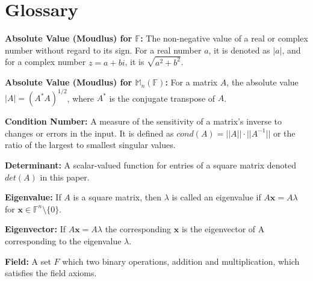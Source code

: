 \section*{Glossary}

\begin{glossary}
    \textbf{Absolute Value (Moudlus) for \(\mathbb{F}\):} The non-negative value of a real or complex number without regard to its sign.
     For a real number \(a\), it is denoted as \(|a|\), and for a complex number \(z = a + bi\), it is \(\sqrt{a^2 + b^2}\).
\end{glossary}

\begin{glossary}
    \textbf{Absolute Value (Moudlus) for \(\mathbb{M}_n\left(\mathbb{F}\right)\):} For a matrix \(A\), the absolute value \(|A|= (A^*A)^{1/2}\), 
    where \(A^*\) is the conjugate transpose of \(A\).
\end{glossary}

\begin{glossary}
    \textbf{Condition Number:} A measure of the sensitivity of a matrix’s inverse to changes or errors in the input. 
    It is defined as \(cond(A) = ||A|| \cdot ||A^{-1}|| \) or the ratio of the largest to smallest singular values.
\end{glossary}

\begin{glossary}
    \textbf{Determinant:} A scalar-valued function for entries of a square matrix denoted \(det(A) \) in this paper.
\end{glossary}

\begin{glossary}
    \textbf{Eigenvalue:} If \(A\) is a square matrix, then \(\lambda\) is called an eigenvalue if \(A \textbf{x} = A \lambda\) for \(\textbf{x} \in \mathbb{F}^n \setminus \{0\}\).

\end{glossary}

\begin{glossary}
    \textbf{Eigenvector:} If \(A\textbf{x} = A \lambda\) the corresponding \(\textbf{x}\) is the eigenvector of A corresponding to the eigenvalue \(\lambda\).
\end{glossary}

\begin{glossary}
    \textbf{Field:} A set \(F\) which two binary operations, addition and multiplication, which satisfies the field axioms.
\end{glossary}

